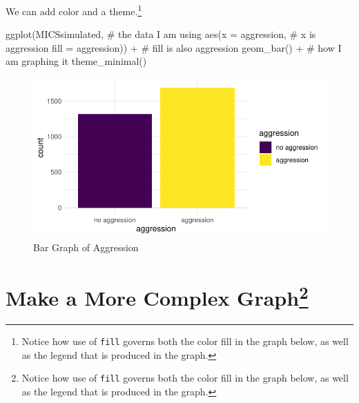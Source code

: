 \documentclass[
  letterpaper,
  DIV=11,
  numbers=noendperiod]{scrreprt}
\newenvironment{Shaded}{\begin{snugshade}}{\end{snugshade}}
\newcommand{\AttributeTok}[1]{\textcolor[rgb]{0.40,0.45,0.13}{#1}}
\newcommand{\CommentTok}[1]{\textcolor[rgb]{0.37,0.37,0.37}{#1}}
\newcommand{\FunctionTok}[1]{\textcolor[rgb]{0.28,0.35,0.67}{#1}}
\newcommand{\NormalTok}[1]{\textcolor[rgb]{0.00,0.23,0.31}{#1}}
\newcommand{\SpecialCharTok}[1]{\textcolor[rgb]{0.37,0.37,0.37}{#1}}
\begin{document}
We can add color and a theme.\footnote{Notice how use of \texttt{fill}
  governs both the color fill in the graph below, as well as the legend
  that is produced in the graph.}

\begin{Shaded}
\begin{Highlighting}[]
\FunctionTok{ggplot}\NormalTok{(MICSsimulated, }\CommentTok{\# the data I am using}
       \FunctionTok{aes}\NormalTok{(}\AttributeTok{x =}\NormalTok{ aggression, }\CommentTok{\# x is aggression}
           \AttributeTok{fill =}\NormalTok{ aggression)) }\SpecialCharTok{+} \CommentTok{\# fill is also aggression}
  \FunctionTok{geom\_bar}\NormalTok{() }\SpecialCharTok{+} \CommentTok{\# how I am graphing it}
  \FunctionTok{theme\_minimal}\NormalTok{()}
\end{Highlighting}
\end{Shaded}

\begin{figure}[H]

{\centering \includegraphics{quick-intro-ggplot2_files/figure-pdf/fig-ggplot-bar-color-1.pdf}

}

\caption{\label{fig-ggplot-bar-color}Bar Graph of Aggression}

\end{figure}

\hypertarget{make-a-more-complex-graphlegend2}{%
\section[Make a More Complex Graph]{\texorpdfstring{Make a More Complex
Graph\footnote{Notice how use of \texttt{fill} governs both the color
  fill in the graph below, as well as the legend that is produced in the
  graph.}}{Make a More Complex Graph}}\label{make-a-more-complex-graphlegend2}}
\end{document}
